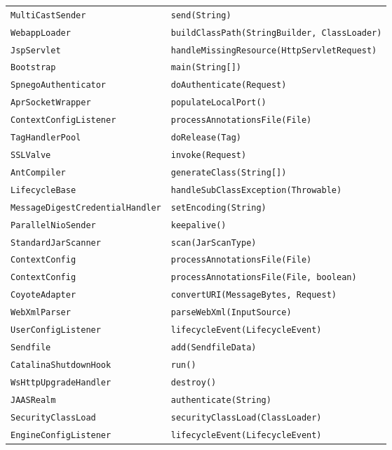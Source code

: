 \begin{center}
\begin{longtable}{ll}
\lstinline/MultiCastSender/&{\lstinline/send(String)/}\\
\lstinline/WebappLoader/&{\lstinline/buildClassPath(StringBuilder, ClassLoader)/}\\
\lstinline/JspServlet/&{\lstinline/handleMissingResource(HttpServletRequest)/}\\
\lstinline/Bootstrap/&{\lstinline/main(String[])/}\\
\lstinline/SpnegoAuthenticator/&{\lstinline/doAuthenticate(Request)/}\\
\lstinline/AprSocketWrapper/&{\lstinline/populateLocalPort()/}\\
\lstinline/ContextConfigListener/&{\lstinline/processAnnotationsFile(File)/}\\
\lstinline/TagHandlerPool/&{\lstinline/doRelease(Tag)/}\\
\lstinline/SSLValve/&{\lstinline/invoke(Request)/}\\
\lstinline/AntCompiler/&{\lstinline/generateClass(String[])/}\\
\lstinline/LifecycleBase/&{\lstinline/handleSubClassException(Throwable)/}\\
\lstinline/MessageDigestCredentialHandler/&{\lstinline/setEncoding(String)/}\\
\lstinline/ParallelNioSender/&{\lstinline/keepalive()/}\\
\lstinline/StandardJarScanner/&{\lstinline/scan(JarScanType)/}\\
\lstinline/ContextConfig/&{\lstinline/processAnnotationsFile(File)/}\\
\lstinline/ContextConfig/&{\lstinline/processAnnotationsFile(File, boolean)/}\\
\lstinline/CoyoteAdapter/&{\lstinline/convertURI(MessageBytes, Request)/}\\
\lstinline/WebXmlParser/&{\lstinline/parseWebXml(InputSource)/}\\
\lstinline/UserConfigListener/&{\lstinline/lifecycleEvent(LifecycleEvent)/}\\
\lstinline/Sendfile/&{\lstinline/add(SendfileData)/}\\
\lstinline/CatalinaShutdownHook/&{\lstinline/run()/}\\
\lstinline/WsHttpUpgradeHandler/&{\lstinline/destroy()/}\\
\lstinline/JAASRealm/&{\lstinline/authenticate(String)/}\\
\lstinline/SecurityClassLoad/&{\lstinline/securityClassLoad(ClassLoader)/}\\
\lstinline/EngineConfigListener/&{\lstinline/lifecycleEvent(LifecycleEvent)/}\\

\end{longtable}
\end{center}
